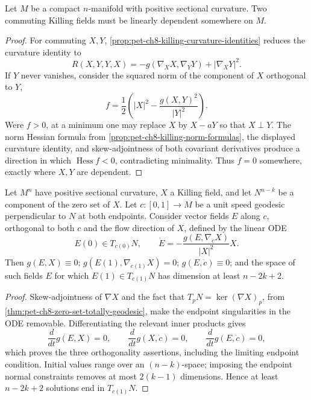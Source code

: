 \begin{theorem}
  \label{thm:pet-ch8-grove-searle-commuting-dependent}
  Let $M$ be a compact $n$-manifold with positive sectional curvature. Two
  commuting Killing fields must be linearly dependent somewhere on $M$.
\end{theorem}
\begin{proof}
  \sketch
  For commuting \(X,Y\), \cref{prop:pet-ch8-killing-curvature-identities}
  reduces the curvature identity to
  \[
    R(X,Y,Y,X)=-g(\nabla_XX,\nabla_YY)+|\nabla_XY|^2.
  \]
  If \(Y\) never vanishes, consider the squared norm of the component of \(X\)
  orthogonal to \(Y\),
  \[
    f=\frac12\left(|X|^2-\frac{g(X,Y)^2}{|Y|^2}\right).
  \]
  Were \(f>0\), at a minimum one may replace \(X\) by \(X-aY\) so that
  \(X\perp Y\). The norm Hessian formula from
  \cref{prop:pet-ch8-killing-norm-formulas}, the displayed curvature identity,
  and skew-adjointness of both covariant derivatives produce a direction in
  which \(\operatorname{Hess}f<0\), contradicting minimality. Thus \(f=0\)
  somewhere, exactly where \(X,Y\) are dependent.
\end{proof}

\begin{lemma}
  \label{lem:pet-ch8-jacobi-type-field}
  Let $M^n$ have positive sectional curvature, $X$ a Killing field, and let
  $N^{n-k}$ be a component of the zero set of $X$. Let $c:[0,1]\to M$ be a unit
  speed geodesic perpendicular to $N$ at both endpoints. Consider vector fields
  $E$ along $c$, orthogonal to both $c$ and the flow direction of $X$, defined
  by the linear ODE
  \[
    E(0)\in T_{c(0)}N,\qquad
    \dot E=-\frac{g(E,\nabla_{\dot c}X)}{|X|^2}X.
  \]
  Then $g(E,X)\equiv0$; $g(E(1),\nabla_{\dot c(1)}X)=0$; $g(E,\dot c)\equiv0$;
  and the space of such fields $E$ for which $E(1)\in T_{c(1)}N$ has dimension
  at least $n-2k+2$.
\end{lemma}
\begin{proof}
  \sketch
  Skew-adjointness of \(\nabla X\) and the fact that
  \(T_pN=\ker(\nabla X)_p\), from
  \cref{thm:pet-ch8-zero-set-totally-geodesic}, make the endpoint singularities
  in the ODE removable. Differentiating the relevant inner products gives
  \[
    \frac d{dt}g(E,X)=0,\qquad
    \frac d{dt}g(X,\dot c)=0,\qquad
    \frac d{dt}g(E,\dot c)=0,
  \]
  which proves the three orthogonality assertions, including the limiting
  endpoint condition. Initial values range over an \((n-k)\)-space; imposing
  the endpoint normal constraints removes at most \(2(k-1)\) dimensions.
  Hence at least \(n-2k+2\) solutions end in \(T_{c(1)}N\).
\end{proof}

